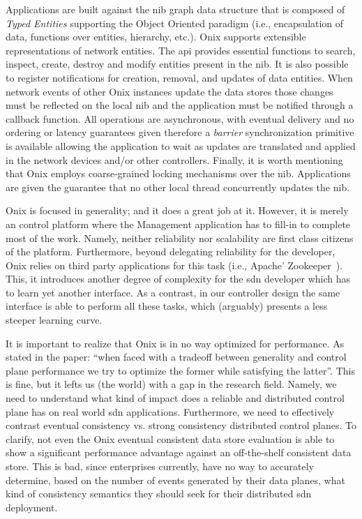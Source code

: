 Applications are built against the \gls{nib} graph data structure that is composed of \emph{Typed Entities} supporting the Object Oriented paradigm (i.e., encapsulation of data, functions over entities, hierarchy, etc.). 
Onix supports extensible representations of network entities. 
The \gls{api}  provides essential functions to search, inspect, create, destroy and modify entities present in the \gls{nib}. 
It is also possible to register notifications for creation, removal, and updates of data entities. 
When network events of other Onix instances update the data stores those changes must be reflected on the local \gls{nib} and the application must be notified through a callback function. 
All operations are asynchronous, with eventual delivery and no ordering or latency guarantees given therefore a \emph{barrier} synchronization primitive is available allowing the application to wait as updates are translated and applied in the network devices and/or other controllers. 
Finally, it is worth mentioning that Onix employs coarse-grained locking mechanisms over the \gls{nib}.
 Applications are given the guarantee that no other local thread concurrently updates the \gls{nib}. 


Onix is focused in generality; and it does a great job at it. 
However, it is merely an control platform where the Management application has to fill-in to complete  most of the work. 
Namely, neither reliability nor scalability are  first class citizens of the platform. 
Furthermore, beyond delegating reliability for the developer, Onix relies on third party applications for this task (i.e., Apache' Zookeeper~\cite{Hun10}). 
This, it introduces another degree of complexity for the \gls{sdn} developer which has to learn yet another interface. 
As a contrast, in our controller design the same interface is able to perform all these tasks,  which (arguably) presents a less steeper learning curve.  

It is important to realize that Onix is in no way optimized for performance. 
As stated in the paper: ``when faced with a tradeoff between generality and control plane performance we try to optimize the former while satisfying the latter''. 
This is fine, but it lefts us (the world) with a gap in the research field. 
Namely, we need to understand what kind of impact does a reliable and distributed control plane has on real world \gls{sdn} applications. 
Furthermore, we need to effectively contrast eventual consistency vs. strong consistency distributed control planes. 
To clarify, not even the Onix eventual consistent  data store evaluation is able to show a significant performance advantage against an off-the-shelf consistent data store.  
This is bad, since enterprises currently, have no way to accurately determine, based on the number of events generated by their data planes, what kind of consistency semantics they should seek for their distributed \gls{sdn} deployment. 

